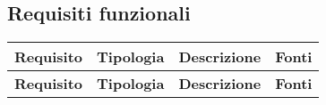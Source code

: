 \subsection{Requisiti funzionali}
\def\arraystretch{1.5}
\begin{longtable}{p{2cm}!{\VRule[1pt]}p{2cm}!{\VRule[1pt]}p{5cm}!{\VRule[1pt]}p{1.5cm}}
	\color{white} \textbf{Requisito} & \color{white} \textbf{Tipologia} & \color{white} \textbf{Descrizione}                                                                                        & \color{white} \textbf{Fonti} \\ 
	\endfirsthead 
	\color{white} \textbf{Requisito} & \color{white} \textbf{Tipologia} & \color{white} \textbf{Descrizione}                                                                                        & \color{white} \textbf{Fonti} \\ 
	\endhead 
	

\end{longtable}
